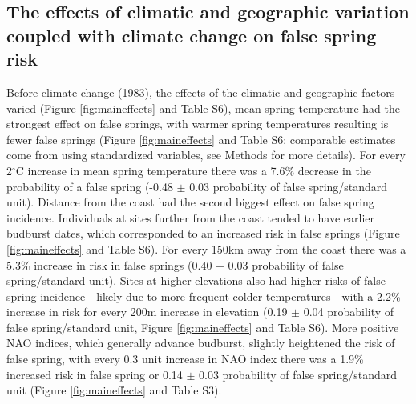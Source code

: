 \documentclass{article}\usepackage[]{graphicx}\usepackage[]{color}
\begin{document}


\subsection*{The effects of climatic and geographic variation coupled with climate change on false spring risk}
Before climate change (1983), the effects of the climatic and geographic factors varied (Figure \ref{fig:maineffects} and Table S6), mean spring temperature had the strongest effect on false springs, with warmer spring temperatures resulting is fewer false springs (Figure \ref{fig:maineffects} and Table S6; comparable estimates come from using standardized variables, see Methods for more details). For every 2$^{\circ}$C increase in mean spring temperature there was a 7.6\% decrease in the probability of a false spring (-0.48 $\pm$ 0.03 probability of false spring/standard unit). Distance from the coast had the second biggest effect on false spring incidence. Individuals at sites further from the coast tended to have earlier budburst dates, which corresponded to an increased risk in false springs (Figure \ref{fig:maineffects} and Table S6). For every 150km away from the coast there was a 5.3\% increase in risk in false springs (0.40 $\pm$ 0.03 probability of false spring/standard unit). Sites at higher elevations also had higher risks of false spring incidence---likely due to more frequent colder temperatures---with a 2.2\% increase in risk for every 200m increase in elevation (0.19 $\pm$ 0.04 probability of false spring/standard unit, Figure \ref{fig:maineffects} and Table S6). More positive NAO indices, which generally advance budburst, slightly heightened the risk of false spring, with every 0.3 unit increase in NAO index there was a 1.9\% increased risk in false spring or 0.14 $\pm$ 0.03 probability of false spring/standard unit (Figure \ref{fig:maineffects} and Table S3).  
\end{document}
